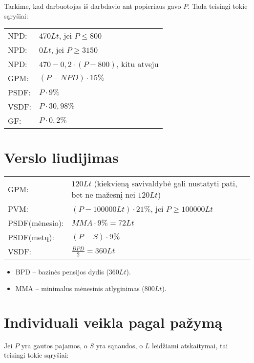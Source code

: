 Tarkime, kad darbuotojas iš darbdavio ant popieriaus gavo $P$. Tada
teisingi tokie sąryšiai:

\begin{tabularx}{15cm}{p{7.5cm}|p{7.5cm}}
  NPD: & $470 Lt$, jei $P \leq 800$ \\
  NPD: & $0 Lt$, jei $P \geq 3150$ \\
  NPD: & $470 - 0,2 \cdot (P - 800)$, kitu atveju \\
  GPM: & $(P - NPD) \cdot 15\%$ \\
  PSDF: & $P \cdot 9\%$ \\
  VSDF: & $P \cdot 30,98\%$ \\
  GF: & $P \cdot 0,2\%$ \\
\end{tabularx}

\section{Verslo liudijimas}

\begin{tabularx}{15cm}{p{7.5cm}|p{7.5cm}}
  GPM: & $120 Lt$ (kiekvieną savivaldybė gali nustatyti pati, bet ne
    mažesnį nei $120 Lt$) \\
  PVM: & $(P - 100 000 Lt) \cdot 21\%$, jei $P \geq 100 000 Lt$ \\
  PSDF(mėnesio): & $MMA \cdot 9\% = 72 Lt$ \\
  PSDF(metų): & $(P - S) \cdot 9\%$ \\
  VSDF: & $\frac{BPD}{2} = 360 Lt$ \\
\end{tabularx}

\begin{itemize}
  \item BPD – bazinės pensijos dydis ($360 Lt$).
  \item MMA – minimalus mėnesinis atlyginimas ($800Lt$).
\end{itemize}

\section{Individuali veikla pagal pažymą}

Jei $P$ yra gautos pajamos, o $S$ yra sąnaudos, o $L$ leidžiami
atskaitymai, tai teisingi tokie sąryšiai:

